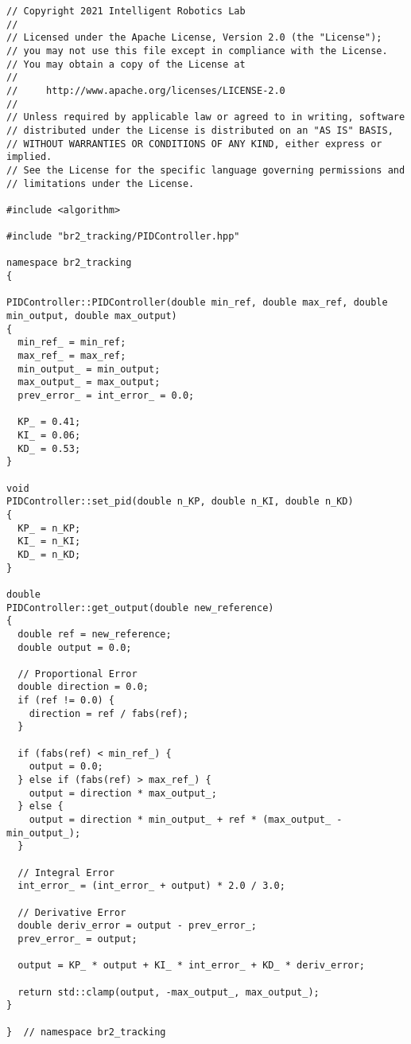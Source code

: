  \footnotesize
\begin{tcolorbox}[sharp corners, colframe=gray!80, colback=LightGray, left=0pt, top=0pt, bottom=0pt, title=\texttt{br2\_tracking/src/br2\_tracking/PIDController.cpp}]
  \begin{verbatim}
// Copyright 2021 Intelligent Robotics Lab
//
// Licensed under the Apache License, Version 2.0 (the "License");
// you may not use this file except in compliance with the License.
// You may obtain a copy of the License at
//
//     http://www.apache.org/licenses/LICENSE-2.0
//
// Unless required by applicable law or agreed to in writing, software
// distributed under the License is distributed on an "AS IS" BASIS,
// WITHOUT WARRANTIES OR CONDITIONS OF ANY KIND, either express or implied.
// See the License for the specific language governing permissions and
// limitations under the License.

#include <algorithm>

#include "br2_tracking/PIDController.hpp"

namespace br2_tracking
{

PIDController::PIDController(double min_ref, double max_ref, double min_output, double max_output)
{
  min_ref_ = min_ref;
  max_ref_ = max_ref;
  min_output_ = min_output;
  max_output_ = max_output;
  prev_error_ = int_error_ = 0.0;

  KP_ = 0.41;
  KI_ = 0.06;
  KD_ = 0.53;
}

void
PIDController::set_pid(double n_KP, double n_KI, double n_KD)
{
  KP_ = n_KP;
  KI_ = n_KI;
  KD_ = n_KD;
}

double
PIDController::get_output(double new_reference)
{
  double ref = new_reference;
  double output = 0.0;

  // Proportional Error
  double direction = 0.0;
  if (ref != 0.0) {
    direction = ref / fabs(ref);
  }

  if (fabs(ref) < min_ref_) {
    output = 0.0;
  } else if (fabs(ref) > max_ref_) {
    output = direction * max_output_;
  } else {
    output = direction * min_output_ + ref * (max_output_ - min_output_);
  }

  // Integral Error
  int_error_ = (int_error_ + output) * 2.0 / 3.0;

  // Derivative Error
  double deriv_error = output - prev_error_;
  prev_error_ = output;

  output = KP_ * output + KI_ * int_error_ + KD_ * deriv_error;

  return std::clamp(output, -max_output_, max_output_);
}

}  // namespace br2_tracking
    \end{verbatim}
    \end{tcolorbox}
  \normalsize

